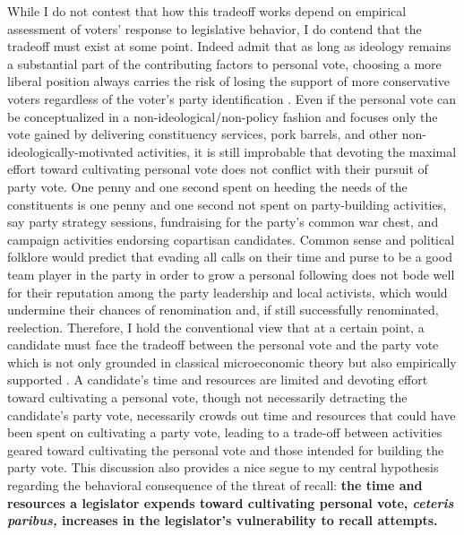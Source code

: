 \documentclass[hyphens, crop=false]{standalone}
\begin{document}
		While I do not contest that how this tradeoff works depend on empirical assessment of voters' response to legislative behavior,
		I do contend that the tradeoff must exist at some point.
		Indeed
		\citeauthor{carseyRethinkingNormalVote2017}
		\autocite*{carseyRethinkingNormalVote2017}
		admit that as long as ideology remains a substantial part of the contributing factors to personal vote,
		choosing a more liberal position always carries the risk of losing the support of more conservative voters regardless of the voter's party identification
		\autocite*[467]{carseyRethinkingNormalVote2017}.
		Even if the personal vote can be conceptualized in a non-ideological/non-policy fashion and focuses only the vote gained by delivering constituency services,
		pork barrels,
		and other non-ideologically-motivated activities,
		it is still improbable that devoting the maximal effort toward cultivating personal vote does not conflict with their pursuit of party vote.
		One penny and one second spent on heeding the needs of the constituents is one penny and one second not spent on party-building activities,
		say party strategy sessions,
		fundraising for the party's common war chest,
		and campaign activities endorsing copartisan candidates.
		Common sense and political folklore would predict that evading all calls on their time and purse to be a good team player in the party in order to grow a personal following does not bode well for their reputation among the party leadership and local activists,
		which would undermine their chances of renomination and,
		if still successfully renominated,
		reelection.
		Therefore,
		I hold the conventional view that at a certain point,
		a candidate must face the tradeoff between the personal vote and the party vote which is not only grounded in classical microeconomic theory but also empirically supported
		\autocite{ansolabehereOldVotersNew2000,primoPartyStrengthPersonal2010}.
		A candidate's time and resources are limited and devoting effort toward cultivating a personal vote,
		though not necessarily detracting the candidate's party vote,
		necessarily crowds out time and resources that could have been spent on cultivating a party vote,
		leading to a trade-off between activities geared toward cultivating the personal vote and those intended for building the party vote.
		This discussion also provides a nice segue to my central hypothesis regarding the behavioral consequence of the threat of recall: 
		\textbf{the time and resources a legislator expends toward cultivating personal vote,
			\textit{ceteris paribus,}
			increases in the legislator's vulnerability to recall attempts.}
		\newpage
%	
\end{document}
